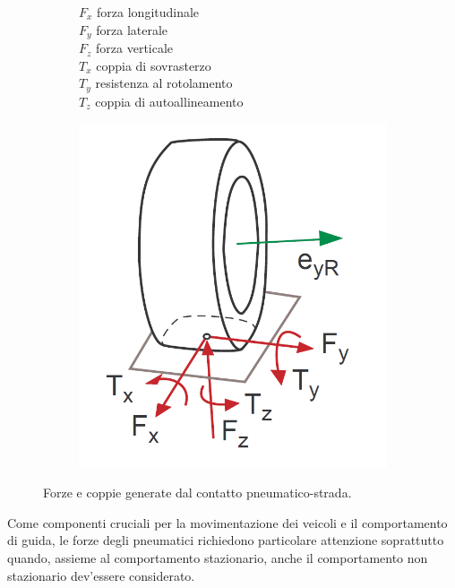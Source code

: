 \begin{figure}[h!]
	\centering
	\begin{subfigure}{0.4\linewidth}
		$F_x$ \quad forza longitudinale\\
		$F_y$ \quad forza laterale\\
		$F_z$ \quad forza verticale\\
		$T_x$ \quad coppia di sovrasterzo\\
		$T_y$ \quad resistenza al rotolamento\\
		$T_z$ \quad coppia di autoallineamento
	\end{subfigure}
	\begin{subfigure}{0.4\linewidth}
		\centering
		\includegraphics[width=\linewidth]{Figures/tire_forces}
	\end{subfigure}
\caption{Forze e coppie generate dal contatto pneumatico-strada.}
\label{tireforces}
\end{figure}
%
Come componenti cruciali per la movimentazione dei veicoli e il comportamento di guida, le forze degli pneumatici richiedono particolare attenzione soprattutto quando, assieme al comportamento stazionario, anche il comportamento non stazionario dev'essere considerato.

